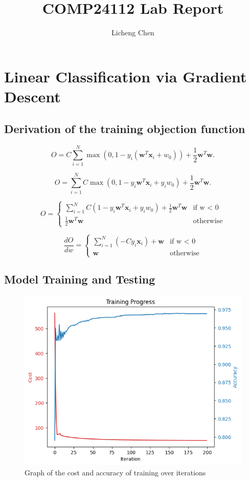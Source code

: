 \documentclass[a4paper]{article}
\title{COMP24112 Lab Report}
\author{Licheng Chen}
\begin{document}
\maketitle

\section{Linear Classification via Gradient Descent}

\subsection{Derivation of the training objection function}

$$O = C \sum^N_{i=1}\max\left(0, 1 - y_i \left(\mathbf{w}^T\mathbf{x}_i + w_0\right)\right) + \frac{1}{2}\mathbf{w}^T\mathbf{w}. $$

$$O = \sum^N_{i=1}C\max\left(0, 1 - y_i\mathbf{w}^T\mathbf{x}_i + y_iw_0\right) + \frac{1}{2}\mathbf{w}^T\mathbf{w}. $$


$$
    O = \begin{cases}
        \sum^N_{i=1}C(1 - y_i\mathbf{w}^T\mathbf{x}_i + y_iw_0) + \frac{1}{2}\mathbf{w}^T\mathbf{w} & \text{if w < 0}  \\
        \frac{1}{2}\mathbf{w}^T\mathbf{w}                                                           & \text{otherwise}
    \end{cases}
$$

$$
    \frac{dO}{dw} = \begin{cases}
        \sum^N_{i=1}(-Cy_i\mathbf{x}_i) + \mathbf{w} & \text{if w < 0}  \\
        \mathbf{w}                                   & \text{otherwise}
    \end{cases}
$$


\subsection{Model Training and Testing}
\begin{figure}[htbp]
    \centering
    \includegraphics[width=0.5\linewidth]{1.11.png}
    \caption{\centering Graph of the cost and accuracy of training over iterations}
\end{figure}
\end{document}
